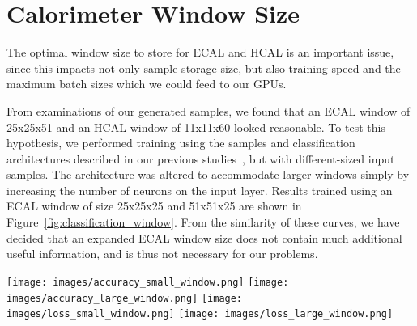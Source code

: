 \section{Calorimeter Window Size}\label{app:window_size}

The optimal window size to store for ECAL and HCAL is an important issue, since this impacts not only sample storage size, but also training speed and the maximum batch sizes which we could feed to our GPUs. 

From examinations of our generated samples, we found that an ECAL window of 25x25x51 and an HCAL window of 11x11x60 looked reasonable. To test this hypothesis, we performed training using the samples and classification architectures described in our previous studies~\cite{NIPS}, but with different-sized input samples. The architecture was altered to accommodate larger windows simply by increasing the number of neurons on the input layer. Results trained using an ECAL window of size 25x25x25 and 51x51x25 are shown in Figure~\ref{fig:classification_window}. From the similarity of these curves, we have decided that an expanded ECAL window size does not contain much additional useful information, and is thus not necessary for our problems.

\begin{figure*}[htbp]
\centering
\texttt{[image: images/accuracy\_small\_window.png]}
\texttt{[image: images/accuracy\_large\_window.png]}
\texttt{[image: images/loss\_small\_window.png]}
\texttt{[image: images/loss\_large\_window.png]}
\caption{Training history for different choices of the input 3D array zise: Accuracy (top) and loss (bottom) as a function of the training batch for photon/neutral pion classification, using a 25x25x25 (left) and 51x51x25 (right) ECAL window size.\label{fig:classification_window}}
\end{figure*}